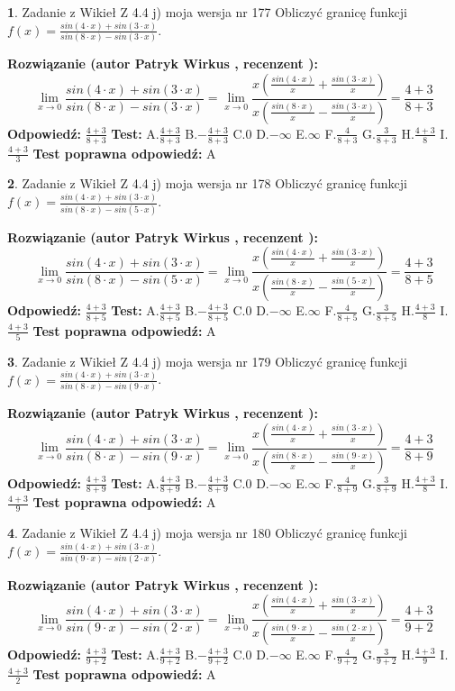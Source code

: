 \documentclass[12pt, a4paper]{article}
\theoremstyle{definition} %
\newtheorem{zad}{}
\newcommand{\zadStart}[1]{\begin{zad}#1\newline}
\newcommand{\zadStop}{\end{zad}}
\newcommand{\rozwStart}[2]{\noindent \textbf{Rozwiązanie (autor #1 , recenzent #2): }\newline}
\newcommand{\rozwStop}{\newline}
\newcommand{\odpStart}{\noindent \textbf{Odpowiedź:}\newline}
\newcommand{\odpStop}{\newline}
\newcommand{\testStart}{\noindent \textbf{Test:}\newline}
\newcommand{\testStop}{\newline}
\newcommand{\kluczStart}{\noindent \textbf{Test poprawna odpowiedź:}\newline}
\newcommand{\kluczStop}{\newline}
\begin{document}
\zadStart{Zadanie z Wikieł Z 4.4 j) moja wersja nr 177}
Obliczyć granicę funkcji $f(x)=\frac{sin(4\cdot x) +sin(3\cdot x)}{sin(8\cdot x) -sin(3\cdot x)}$.
\zadStop
\rozwStart{Patryk Wirkus}{}
$$\lim\limits_{x\to 0}\frac{sin(4\cdot x) +sin(3\cdot x)}{sin(8\cdot x) -sin(3\cdot x)}=\lim\limits_{x\to 0}\frac{x(\frac{sin(4\cdot x)}{x}+\frac{sin(3\cdot x)}{x})}{x(\frac{sin(8\cdot x)}{x}-\frac{sin(3\cdot x)}{x})}=\frac{4+3}{8+3}$$
\rozwStop
\odpStart
$\frac{4+3}{8+3}$
\odpStop
\testStart
A.$\frac{4+3}{8+3}$
B.$-\frac{4+3}{8+3}$
C.$0$
D.$-\infty$
E.$\infty$
F.$\frac{4}{8+3}$
G.$\frac{3}{8+3}$
H.$\frac{4+3}{8}$
I.$\frac{4+3}{3}$
\testStop
\kluczStart
A
\kluczStop



\zadStart{Zadanie z Wikieł Z 4.4 j) moja wersja nr 178}
Obliczyć granicę funkcji $f(x)=\frac{sin(4\cdot x) +sin(3\cdot x)}{sin(8\cdot x) -sin(5\cdot x)}$.
\zadStop
\rozwStart{Patryk Wirkus}{}
$$\lim\limits_{x\to 0}\frac{sin(4\cdot x) +sin(3\cdot x)}{sin(8\cdot x) -sin(5\cdot x)}=\lim\limits_{x\to 0}\frac{x(\frac{sin(4\cdot x)}{x}+\frac{sin(3\cdot x)}{x})}{x(\frac{sin(8\cdot x)}{x}-\frac{sin(5\cdot x)}{x})}=\frac{4+3}{8+5}$$
\rozwStop
\odpStart
$\frac{4+3}{8+5}$
\odpStop
\testStart
A.$\frac{4+3}{8+5}$
B.$-\frac{4+3}{8+5}$
C.$0$
D.$-\infty$
E.$\infty$
F.$\frac{4}{8+5}$
G.$\frac{3}{8+5}$
H.$\frac{4+3}{8}$
I.$\frac{4+3}{5}$
\testStop
\kluczStart
A
\kluczStop



\zadStart{Zadanie z Wikieł Z 4.4 j) moja wersja nr 179}
Obliczyć granicę funkcji $f(x)=\frac{sin(4\cdot x) +sin(3\cdot x)}{sin(8\cdot x) -sin(9\cdot x)}$.
\zadStop
\rozwStart{Patryk Wirkus}{}
$$\lim\limits_{x\to 0}\frac{sin(4\cdot x) +sin(3\cdot x)}{sin(8\cdot x) -sin(9\cdot x)}=\lim\limits_{x\to 0}\frac{x(\frac{sin(4\cdot x)}{x}+\frac{sin(3\cdot x)}{x})}{x(\frac{sin(8\cdot x)}{x}-\frac{sin(9\cdot x)}{x})}=\frac{4+3}{8+9}$$
\rozwStop
\odpStart
$\frac{4+3}{8+9}$
\odpStop
\testStart
A.$\frac{4+3}{8+9}$
B.$-\frac{4+3}{8+9}$
C.$0$
D.$-\infty$
E.$\infty$
F.$\frac{4}{8+9}$
G.$\frac{3}{8+9}$
H.$\frac{4+3}{8}$
I.$\frac{4+3}{9}$
\testStop
\kluczStart
A
\kluczStop



\zadStart{Zadanie z Wikieł Z 4.4 j) moja wersja nr 180}
Obliczyć granicę funkcji $f(x)=\frac{sin(4\cdot x) +sin(3\cdot x)}{sin(9\cdot x) -sin(2\cdot x)}$.
\zadStop
\rozwStart{Patryk Wirkus}{}
$$\lim\limits_{x\to 0}\frac{sin(4\cdot x) +sin(3\cdot x)}{sin(9\cdot x) -sin(2\cdot x)}=\lim\limits_{x\to 0}\frac{x(\frac{sin(4\cdot x)}{x}+\frac{sin(3\cdot x)}{x})}{x(\frac{sin(9\cdot x)}{x}-\frac{sin(2\cdot x)}{x})}=\frac{4+3}{9+2}$$
\rozwStop
\odpStart
$\frac{4+3}{9+2}$
\odpStop
\testStart
A.$\frac{4+3}{9+2}$
B.$-\frac{4+3}{9+2}$
C.$0$
D.$-\infty$
E.$\infty$
F.$\frac{4}{9+2}$
G.$\frac{3}{9+2}$
H.$\frac{4+3}{9}$
I.$\frac{4+3}{2}$
\testStop
\kluczStart
A
\kluczStop
\end{document}

